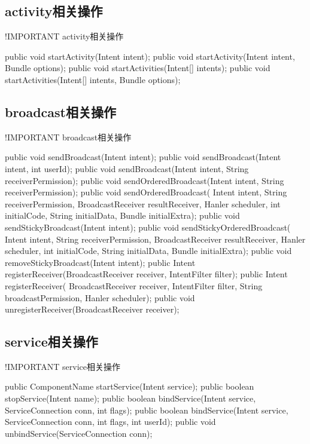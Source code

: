 \subsection[activity相关操作]{activity相关操作}
!IMPORTANT activity相关操作

\begin{javacode}
public void startActivity(Intent intent);
public void startActivity(Intent intent, Bundle options);
public void startActivities(Intent[] intents);
public void startActivities(Intent[] intents, Bundle options);
\end{javacode}

\subsection[broadcast相关操作]{broadcast相关操作}
!IMPORTANT broadcast相关操作

\begin{javacode}
public void sendBroadcast(Intent intent);
public void sendBroadcast(Intent intent, int userId);
public void sendBroadcast(Intent intent, String receiverPermission);
public void sendOrderedBroadcast(Intent intent, String receiverPermission);
public void sendOrderedBroadcast(
            Intent intent,
            String receiverPermission,
            BroadcastReceiver resultReceiver,
            Hanler scheduler,
            int initialCode,
            String initialData,
            Bundle initialExtra);
public void sendStickyBroadcast(Intent intent);
public void sendStickyOrderedBroadcast(
            Intent intent,
            String receiverPermission,
            BroadcastReceiver resultReceiver,
            Hanler scheduler,
            int initialCode,
            String initialData,
            Bundle initialExtra);
public void removeStickyBroadcast(Intent intent);
public Intent registerReceiver(BroadcastReceiver receiver, IntentFilter filter);
public Intent registerReceiver(
            BroadcastReceiver receiver,
            IntentFilter filter,
            String broadcastPermission,
            Hanler scheduler);
public void unregisterReceiver(BroadcastReceiver receiver);
\end{javacode}

\subsection[service相关操作]{service相关操作}
!IMPORTANT service相关操作

\begin{javacode}
public ComponentName startService(Intent service);
public boolean stopService(Intent name);
public boolean bindService(Intent service, ServiceConnection conn, int flags);
public boolean bindService(Intent service, ServiceConnection conn, int flags, int userId);
public void unbindService(ServiceConnection conn);
\end{javacode}

